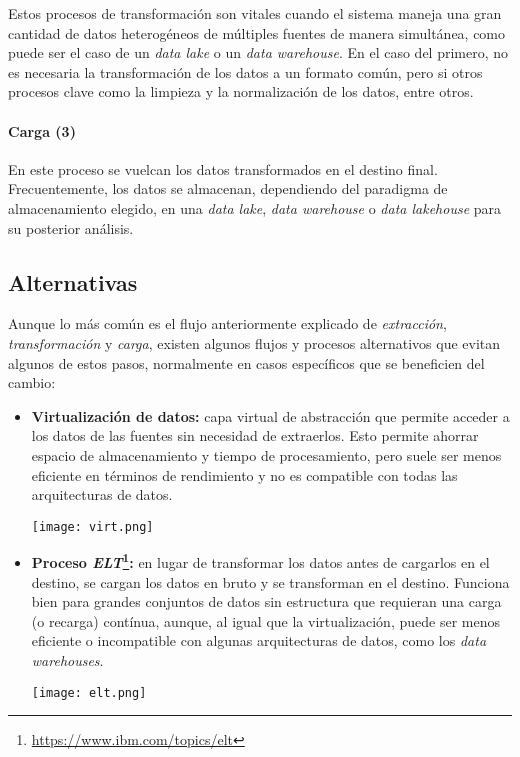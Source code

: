 Estos procesos de transformación son vitales cuando el sistema maneja una gran cantidad de datos heterogéneos
de múltiples fuentes de manera simultánea, como puede ser el caso de un \textit{data lake} o un \textit{data
warehouse}. En el caso del primero, no es necesaria la transformación de los datos a un formato común, pero si
otros procesos clave como la limpieza y la normalización de los datos, entre otros.

\paragraph{Carga (3)}
En este proceso se vuelcan los datos transformados en el destino final. Frecuentemente, los datos se
almacenan, dependiendo del paradigma de almacenamiento elegido, en una \textit{data lake}, \textit{data warehouse}
o \textit{data lakehouse} para su posterior análisis.

\newpage{}
\subsection{Alternativas}
Aunque lo más común es el flujo anteriormente explicado de \textit{extracción}, \textit{transformación} y
\textit{carga}, existen algunos flujos y procesos alternativos que evitan algunos de estos pasos, normalmente
en casos específicos que se beneficien del cambio:

\begin{itemize}
	\item \textbf{Virtualización de datos:} capa virtual de abstracción que permite acceder a los datos de las
		fuentes sin necesidad de extraerlos. Esto permite ahorrar espacio de almacenamiento y tiempo de procesamiento,
		pero suele ser menos eficiente en términos de rendimiento y no es compatible con todas las arquitecturas de
		datos.

		\begin{minipage}{\linewidth}
			\centering
			\texttt{[image: virt.png]}
		\end{minipage}
	\item \textbf{Proceso \textit{ELT}\footnote{\url{https://www.ibm.com/topics/elt}}:} en lugar de transformar
		los datos antes de cargarlos en el destino, se cargan los datos en bruto y se transforman en el destino.
		Funciona bien para grandes conjuntos de datos sin estructura que requieran una carga (o recarga) contínua,
		aunque, al igual que la virtualización, puede ser menos eficiente o incompatible con algunas arquitecturas
		de datos, como los \textit{data warehouses}.

		\begin{minipage}{\linewidth}
			\centering
			\texttt{[image: elt.png]}
		\end{minipage}
\end{itemize}


